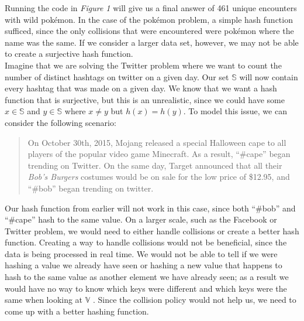\documentclass{article}
\begin{document}
\noindent Running the code in \textit{Figure 1} will give us a final answer of 461 unique encounters with wild pok\'emon. 
In the case of the pok\'emon problem, a simple hash function sufficed, since the only collisions that were encountered were pok\'emon where the name was the same. 
If we consider a larger data set, however, we may not be able to create a surjective hash function.\\
\indent Imagine that we are solving the Twitter problem where we want to count the number of distinct hashtags on twitter on a given day. 
Our set $\mathbb{S}$ will now contain every hashtag that was made on a given day. 
We know that we want a hash function that is surjective, but this is an unrealistic, since we could have some $x \in \mathbb{S}$ and $y\in\mathbb{S}$ where $x \neq y$ but $h(x) = h(y)$. 
To model this issue, we can consider the following scenario:
\begin{quote}
On October 30th, 2015, Mojang released a special Halloween cape to all players of the popular video game Minecraft. 
As a result, ``\#cape'' began trending on Twitter.
On the same day, Target announced that all their \textit{Bob's Burgers} costumes would be on sale for the low price of \$12.95, and ``\#bob'' began trending on twitter.
\end{quote}  \clearpage
Our hash function from earlier will not work in this case, since both ``\#bob'' and ``\#cape'' hash to the same value. 
On a larger scale, such as the Facebook or Twitter problem, we would need to either handle collisions or create a better hash function. 
Creating a way to handle collisions would not be beneficial, since the data is being processed in real time. 
We would not be able to tell if we were hashing a value we already have seen or hashing a new value that happens to hash to the same value as another element we have already seen; as a result we would have no way to know which keys were different and which keys were the same when looking at $\mathbb{V}$ \cite[p. 6]{Maurer}. 
Since the collision policy would not help us, we need to come up with a better hashing function.\\
\end{document}

